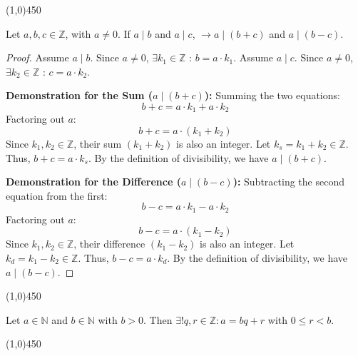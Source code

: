 \begin{center}
    \vspace{10pt}
    \line(1,0){450}
    \vspace{25pt}
\end{center}

\begin{proposition}
    Let $a, b, c \in \mathbb{Z}$, with $a \neq 0$.
    If $a \mid b$ and $a \mid c$, $\rightarrow a \mid (b+c)$ and $a \mid (b-c)$.
\end{proposition}

\begin{proof}
    Assume $a \mid b$. Since $a \neq 0$, $\exists k_1 \in \mathbb{Z}$ : $b = a \cdot k_1$.
    Assume $a \mid c$. Since $a \neq 0$, $\exists k_2 \in \mathbb{Z}$ : $c = a \cdot k_2$.
    
    \textbf{Demonstration for the Sum ($a \mid (b+c)$):}
    Summing the two equations:
    $$b + c = a \cdot k_1 + a \cdot k_2$$
    Factoring out $a$:
    $$b + c = a \cdot (k_1 + k_2)$$
    Since $k_1, k_2 \in \mathbb{Z}$, their sum $(k_1 + k_2)$ is also an integer. Let $k_s = k_1 + k_2 \in \mathbb{Z}$.
    Thus, $b+c = a \cdot k_s$.
    By the definition of divisibility, we have $a \mid (b+c)$.
    
    \textbf{Demonstration for the Difference ($a \mid (b-c)$):}
    Subtracting the second equation from the first:
    $$b - c = a \cdot k_1 - a \cdot k_2$$
    Factoring out $a$:
    $$b - c = a \cdot (k_1 - k_2)$$
    Since $k_1, k_2 \in \mathbb{Z}$, their difference $(k_1 - k_2)$ is also an integer. Let $k_d = k_1 - k_2 \in \mathbb{Z}$.
    Thus, $b-c = a \cdot k_d$.
    By the definition of divisibility, we have $a \mid (b-c)$.
\end{proof}

\begin{center}
    \vspace{10pt}
    \line(1,0){450}
    \vspace{25pt}
\end{center}

\begin{proposition}
Let $a \in \mathbb{N}$ and $b \in \mathbb{N}$ with $b > 0$. Then $\exists! q, r \in \mathbb{Z} : a = bq + r$ with $0 \leq r < b$.
\end{proposition}

\begin{center}
    \vspace{10pt}
    \line(1,0){450}
    \vspace{25pt}
\end{center}

